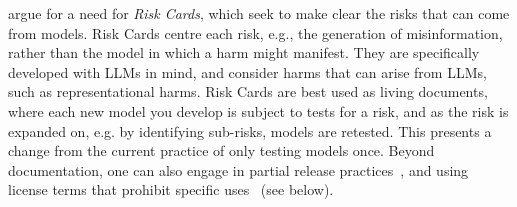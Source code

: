 \citet{derczynski_assessing_2023} argue for a need for \textit{Risk Cards}, which seek to make clear the risks that can come from models. Risk Cards centre each risk, e.g., the generation of misinformation, rather than the model in which a harm might manifest. They are specifically developed with LLMs in mind, and consider harms that can arise from LLMs, such as representational harms. %
Risk Cards are best used as living documents, where each new model you develop is subject to tests for a risk, and as the risk is expanded on, e.g. by identifying sub-risks, models are retested. This presents a change from the current practice of only testing models once.
Beyond documentation, one can also engage in partial release practices~\cite{kaffee_thorny_2023,solaiman_release_2019}, and using license terms that prohibit specific uses~\cite{McDuff_Standardization_2024,jernite_data_2022} (see below). 


